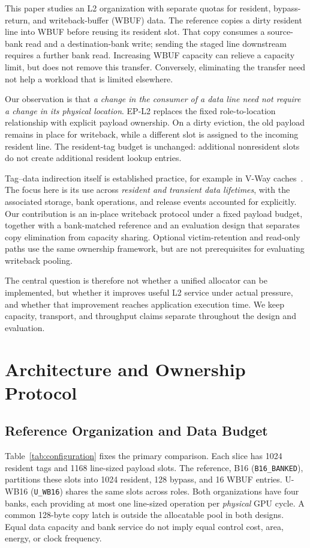 \documentclass[conference,letterpaper]{IEEEtran}
\newcommand{\epl}{EP-L2}
\newcommand{\base}{B16}
\newcommand{\unif}{U-WB16}
\begin{document}
This paper studies an L2 organization with separate quotas for resident, bypass-return, and writeback-buffer (WBUF) data. The reference copies a dirty resident line into WBUF before reusing its resident slot. That copy consumes a source-bank read and a destination-bank write; sending the staged line downstream requires a further bank read. Increasing WBUF capacity can relieve a capacity limit, but does not remove this transfer. Conversely, eliminating the transfer need not help a workload that is limited elsewhere.

Our observation is that \emph{a change in the consumer of a data line need not require a change in its physical location}. \epl{} replaces the fixed role-to-location relationship with explicit payload ownership. On a dirty eviction, the old payload remains in place for writeback, while a different slot is assigned to the incoming resident line. The resident-tag budget is unchanged: additional nonresident slots do not create additional resident lookup entries.

Tag--data indirection itself is established practice, for example in V-Way caches~\cite{vway}. The focus here is its use across \emph{resident and transient data lifetimes}, with the associated storage, bank operations, and release events accounted for explicitly. Our contribution is an in-place writeback protocol under a fixed payload budget, together with a bank-matched reference and an evaluation design that separates copy elimination from capacity sharing. Optional victim-retention and read-only paths use the same ownership framework, but are not prerequisites for evaluating writeback pooling.

The central question is therefore not whether a unified allocator can be implemented, but whether it improves useful L2 service under actual pressure, and whether that improvement reaches application execution time. We keep capacity, transport, and throughput claims separate throughout the design and evaluation.

\section{Architecture and Ownership Protocol}
\subsection{Reference Organization and Data Budget}
Table~\ref{tab:configuration} fixes the primary comparison. Each slice has 1024 resident tags and 1168 line-sized payload slots. The reference, \base{} (\texttt{B16\_BANKED}), partitions these slots into 1024 resident, 128 bypass, and 16 WBUF entries. \unif{} (\texttt{U\_WB16}) shares the same slots across roles. Both organizations have four banks, each providing at most one line-sized operation per \emph{physical} GPU cycle. A common 128-byte copy latch is outside the allocatable pool in both designs. Equal data capacity and bank service do not imply equal control cost, area, energy, or clock frequency.
\end{document}
